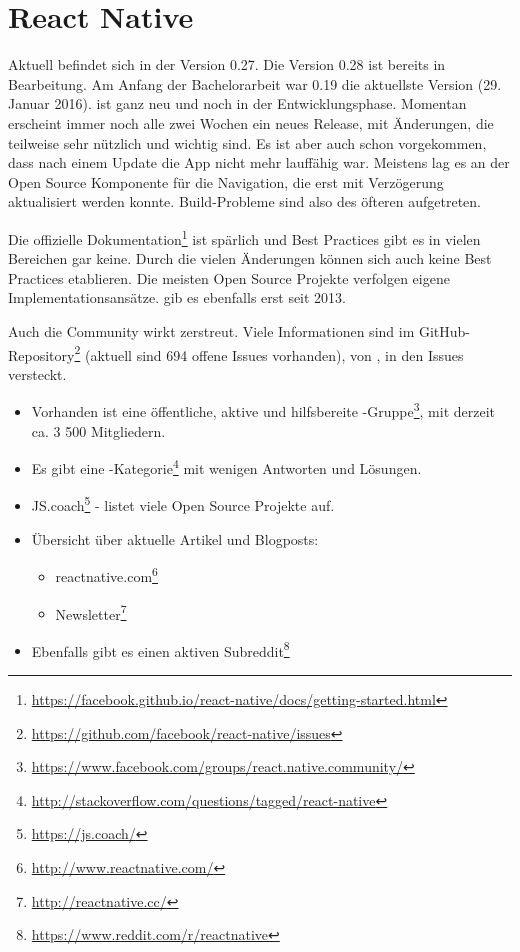 \section{React Native}
Aktuell befindet sich  in der Version 0.27.
Die Version 0.28 ist bereits in Bearbeitung.
Am Anfang der Bachelorarbeit war 0.19 die aktuellste Version (29. Januar 2016).
 ist ganz neu und noch in der Entwicklungsphase.
Momentan erscheint immer noch alle zwei Wochen ein neues Release, mit Änderungen, die teilweise sehr nützlich und wichtig sind.
Es ist aber auch schon vorgekommen, dass nach einem Update die App nicht mehr lauffähig war.
Meistens lag es an der Open Source Komponente für die Navigation, die erst mit Verzögerung aktualisiert werden konnte.
Build-Probleme sind also des öfteren aufgetreten.

Die offizielle Dokumentation\footnote{\url{https://facebook.github.io/react-native/docs/getting-started.html}} ist spärlich und Best Practices gibt es in vielen Bereichen gar keine.
Durch die vielen Änderungen können sich auch keine Best Practices etablieren.
 Die meisten Open Source Projekte verfolgen eigene Implementationsansätze.
 gib es ebenfalls erst seit 2013.

Auch die Community wirkt zerstreut. 
Viele Informationen sind im GitHub-Repository\footnote{\url{https://github.com/facebook/react-native/issues}} (aktuell sind 694 offene Issues vorhanden), von , in den Issues versteckt.

\begin{itemize}
	\item Vorhanden ist eine öffentliche, aktive und hilfsbereite -Gruppe\footnote{\url{https://www.facebook.com/groups/react.native.community/}}, mit derzeit ca. 3 500 Mitgliedern.
	\item Es gibt eine -Kategorie\footnote{\url{http://stackoverflow.com/questions/tagged/react-native}} mit wenigen Antworten und Lösungen.
	\item JS.coach\footnote{\url{https://js.coach/}} - listet viele Open Source Projekte auf.
	\item Übersicht über aktuelle Artikel und Blogposts: 
	\begin{itemize}
		\item reactnative.com\footnote{\url{http://www.reactnative.com/}}
		\item {} Newsletter\footnote{\url{http://reactnative.cc/}}
	\end{itemize}
	\item Ebenfalls gibt es einen aktiven Subreddit\footnote{\url{https://www.reddit.com/r/reactnative}}
\end{itemize}


